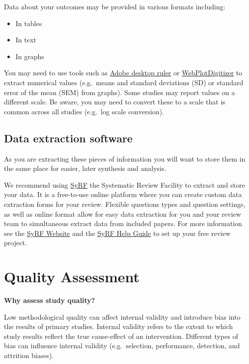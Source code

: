 \documentclass[
]{book}
\begin{document}
Data about your outcomes may be provided in various formats including:

\begin{itemize}
\item
  In tables
\item
  In text
\item
  In graphs
\end{itemize}

You may need to use tools such as \href{https://helpx.adobe.com/acrobat/using/grids-guides-measurements-pdfs.html}{Adobe desktop ruler} or \href{https://automeris.io/WebPlotDigitizer/}{WebPlotDigitizer} to extract numerical values (e.g.~means and standard deviations (SD) or standard error of the mean (SEM) from graphs). Some studies may report values on a different scale. Be aware, you may need to convert these to a scale that is common across all studies (e.g.~log scale conversion).

\hypertarget{data-extraction-software}{%
\section{Data extraction software}\label{data-extraction-software}}

As you are extracting these pieces of information you will want to store them in the same place for easier, later synthesis and analysis.

We recommend using \href{https://syrf.org.uk/}{SyRF} the Systematic Review Facility to extract and store your data. It is a free-to-use online platform where you can create custom data extraction forms for your review. Flexible questions types and question settings, as well as online format allow for easy data extraction for you and your review team to simultaneous extract data from included papers. For more information see the \href{https://syrf.org.uk/}{SyRF Website} and the \href{https://help.syrf.org.uk/}{SyRF Help Guide} to set up your free review project.

\hypertarget{quality-assessment}{%
\chapter{Quality Assessment}\label{quality-assessment}}

\textbf{Why assess study quality?}

Low methodological quality can affect internal validity and introduce bias into the results of primary studies. Internal validity refers to the extent to which study results reflect the true cause-effect of an intervention. Different types of bias can influence internal validity (e.g.~selection, performance, detection, and attrition biases).
\end{document}
